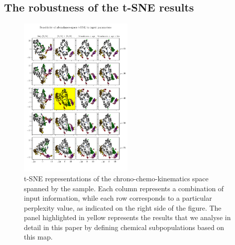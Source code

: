 \documentclass{aa}  %
\begin{document}
\subsection{The robustness of the t-SNE results}\label{robust}

\begin{figure}\centering
 \includegraphics[width=0.49\textwidth]{im/harps-tSNE_perplexitytest_withsubsets.png}
\caption{t-SNE representations of the chrono-chemo-kinematics space spanned by the \citet{DelgadoMena2017} sample. Each column represents a combination of input information, while each row corresponds to a particular perplexity value, as indicated on the right side of the figure. The panel highlighted in yellow represents the results that we analyse in detail in this paper by defining chemical subpopulations based on this map.}
\label{perplexitytest2}
\end{figure}
\end{document}
